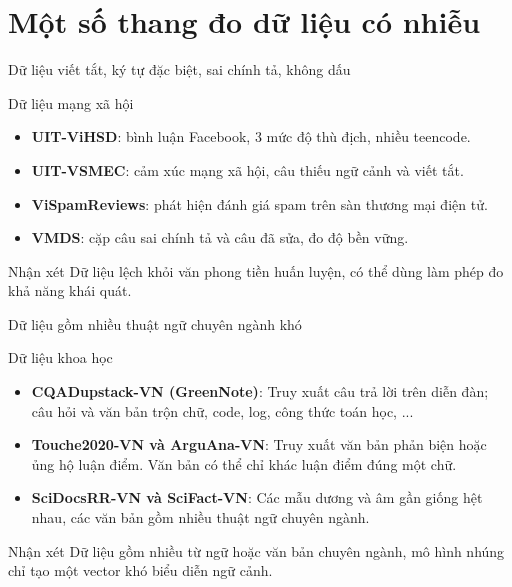 \documentclass[aspectratio=169,10pt]{beamer}
\begin{document}
\section{Một số thang đo dữ liệu có nhiễu}
\begin{frame}{Dữ liệu viết tắt, ký tự đặc biệt, sai chính tả, không dấu}
    \begin{block}{Dữ liệu mạng xã hội}
        \begin{itemize}
            \item \textbf{UIT-ViHSD}: bình luận Facebook, 3 mức độ thù địch, nhiều teencode.
            \item \textbf{UIT-VSMEC}: cảm xúc mạng xã hội, câu thiếu ngữ cảnh và viết tắt.
            \item \textbf{ViSpamReviews}: phát hiện đánh giá spam trên sàn thương mại điện tử.
            \item \textbf{VMDS}: cặp câu sai chính tả và câu đã sửa, đo độ bền vững.
        \end{itemize}
    \end{block}
    \begin{block}{Nhận xét}
        Dữ liệu lệch khỏi văn phong tiền huấn luyện, có thể dùng làm phép đo \\ khả năng khái quát.
    \end{block}
\end{frame}

\begin{frame}{Dữ liệu gồm nhiều thuật ngữ chuyên ngành khó}
    \begin{block}{Dữ liệu khoa học}
        \begin{itemize}
            \item \textbf{CQADupstack-VN (GreenNote)}: Truy xuất câu trả lời trên diễn đàn; câu hỏi và văn bản trộn chữ, code, log, công thức toán học, ...
            \item \textbf{Touche2020-VN và ArguAna-VN}: Truy xuất văn bản phản biện hoặc ủng hộ luận điểm. Văn bản có thể chỉ khác luận điểm đúng một chữ.
            \item \textbf{SciDocsRR-VN và SciFact-VN}: Các mẫu dương và âm gần giống hệt nhau, các văn bản gồm nhiều thuật ngữ chuyên ngành.
        \end{itemize}
    \end{block}
    \begin{block}{Nhận xét}
        Dữ liệu gồm nhiều từ ngữ hoặc văn bản chuyên ngành, mô hình nhúng chỉ tạo một vector khó biểu diễn ngữ cảnh.
    \end{block}
\end{frame}
\end{document}
